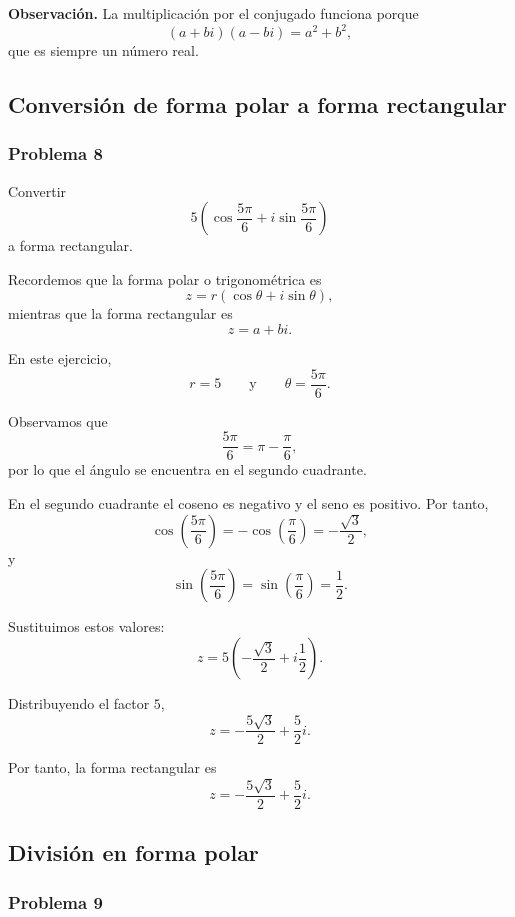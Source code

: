 \medskip

\noindent
\textbf{Observación.}
La multiplicación por el conjugado funciona porque
\[
(a+bi)(a-bi)=a^2+b^2,
\]
que es siempre un número real.

\subsection{Conversión de forma polar a forma rectangular}

\subsubsection*{Problema 8}

Convertir
\[
5\left(
\cos\frac{5\pi}{6}
+i\sin\frac{5\pi}{6}
\right)
\]
a forma rectangular.

Recordemos que la forma polar o trigonométrica es
\[
z=r(\cos\theta+i\sin\theta),
\]
mientras que la forma rectangular es
\[
z=a+bi.
\]

En este ejercicio,
\[
r=5
\qquad\text{y}\qquad
\theta=\frac{5\pi}{6}.
\]

Observamos que
\[
\frac{5\pi}{6}
=
\pi-\frac{\pi}{6},
\]
por lo que el ángulo se encuentra en el segundo cuadrante.

En el segundo cuadrante el coseno es negativo y el seno es positivo.
Por tanto,
\[
\cos\left(\frac{5\pi}{6}\right)
=
-\cos\left(\frac{\pi}{6}\right)
=
-\frac{\sqrt3}{2},
\]
y
\[
\sin\left(\frac{5\pi}{6}\right)
=
\sin\left(\frac{\pi}{6}\right)
=
\frac12.
\]

Sustituimos estos valores:
\[
z
=
5\left(
-\frac{\sqrt3}{2}
+i\frac12
\right).
\]

Distribuyendo el factor $5$,
\[
z
=
-\frac{5\sqrt3}{2}
+
\frac52i.
\]

Por tanto, la forma rectangular es
\[
\boxed{
z=-\frac{5\sqrt3}{2}+\frac52i
}.
\]

\subsection{División en forma polar}

\subsubsection*{Problema 9}

